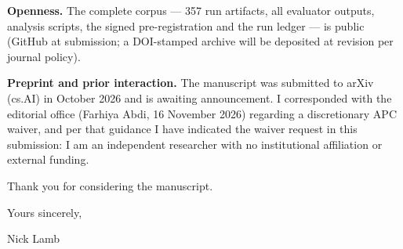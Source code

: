\documentclass[11pt]{article}
\begin{document}
\textbf{Openness.} The complete corpus --- 357 run artifacts, all evaluator outputs, analysis scripts, the signed pre-registration and the run ledger --- is public (GitHub at submission; a DOI-stamped archive will be deposited at revision per journal policy).

\textbf{Preprint and prior interaction.} The manuscript was submitted to arXiv (cs.AI) in October 2026 and is awaiting announcement. I corresponded with the editorial office (Farhiya Abdi, 16 November 2026) regarding a discretionary APC waiver, and per that guidance I have indicated the waiver request in this submission: I am an independent researcher with no institutional affiliation or external funding.

Thank you for considering the manuscript.

\vspace{0.6em}
\noindent Yours sincerely,

\noindent Nick Lamb
\end{document}

